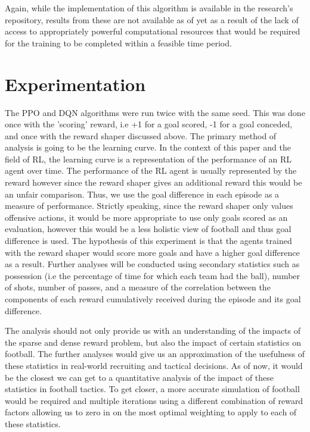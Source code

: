 \documentclass[11pt]{article}
\begin{document}
Again, while the implementation of this algorithm is available in the research's repository, results from these are not available as of yet as a result of the lack of access to appropriately powerful computational resources that would be required for the training to be completed within a feasible time period.

\section{Experimentation}
The PPO and DQN algorithms were run twice with the same seed. This was done once with the 'scoring' reward, i.e +1 for a goal scored, -1 for a goal conceded, and once with the reward shaper discussed above. The primary method of analysis is going to be the learning curve. In the context of this paper and the field of RL, the learning curve is a representation of the performance of an RL agent over time. The performance of the RL agent is usually represented by the reward however since the reward shaper gives an additional reward this would be an unfair comparison. Thus, we use the goal difference in each episode as a measure of performance. Strictly speaking, since the reward shaper only values offensive actions, it would be more appropriate to use only goals scored as an evaluation, however this would be a less holistic view of football and thus goal difference is used. The hypothesis of this experiment is that the agents trained with the reward shaper would score more goals and have a higher goal difference as a result. Further analyses will be conducted using secondary statistics such as possession (i.e the percentage of time for which each team had the ball), number of shots, number of passes, and a measure of the correlation between the components of each reward cumulatively received during the episode and its goal difference. 

The analysis should not only provide us with an understanding of the impacts of the sparse and dense reward problem, but also the impact of certain statistics on football. The further analyses would give us an approximation of the usefulness of these statistics in real-world recruiting and tactical decisions. As of now, it would be the closest we can get to a quantitative analysis of the impact of these statistics in football tactics. To get closer, a more accurate simulation of football would be required and multiple iterations using a different combination of reward factors allowing us to zero in on the most optimal weighting to apply to each of these statistics.
\end{document}
